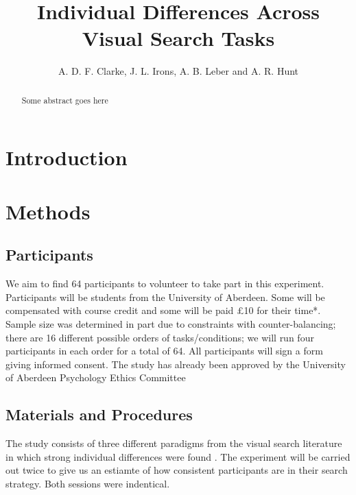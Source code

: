 \documentclass[a4paper, oneside, 11pt, onecolumn]{article}
\begin{document}
\title{Individual Differences Across Visual Search Tasks}

\author{A. D. F. Clarke, J. L. Irons, A. B. Leber and A. R. Hunt}

\maketitle

\begin{abstract}
Some abstract goes here
\end{abstract}

\section{Introduction}


\section{Methods}


\subsection{Participants}
We aim to find 64 participants to volunteer to take part in this experiment. Participants will be students from the University of Aberdeen. Some will be compensated with course credit and some will be paid £10 for their time*. Sample size was determined in part due to constraints with counter-balancing; there are 16 different possible orders of tasks/conditions; we will run four participants in each order for a total of 64. All participants will sign a form giving informed consent. The study has already been approved by the University of Aberdeen Psychology Ethics Committee 

\subsection{Materials and Procedures}

The study consists of three different paradigms from the visual search literature in which strong individual differences were found \citep{nowakowsak2017, irons-leber2016, kristjansson2014}. The \cite{nowakowsak2017} experiment will be carried out twice to give us an estiamte of how consistent participants are in their search strategy. Both sessions were indentical.
\end{document}
